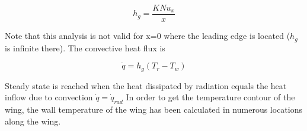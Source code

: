 \begin{equation}
h_g=\frac{K Nu_x}{x}
\end{equation}

Note that this analysis is not valid for x=0 where the leading edge is located ($h_g$ is infinite there).
The convective heat flux is 

\begin{equation}
\dot{q}=h_g (T_r-T_w)
\end{equation}


Steady state is reached when the heat dissipated by radiation equals the heat inflow due to convection $\dot{q}=\dot{q}_{rad}$
In order to get the temperature contour of the wing, the wall temperature of the wing has been calculated in numerous locations along the wing.